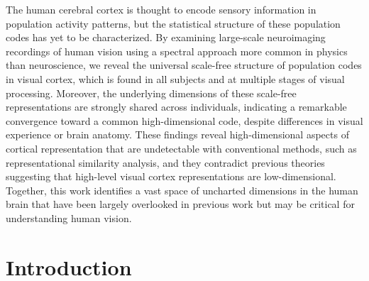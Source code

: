 \documentclass[10pt]{article}
\begin{document}
The human cerebral cortex is thought to encode sensory information in population activity patterns, but the statistical structure of these population codes has yet to be characterized. By examining large-scale neuroimaging recordings of human vision using a spectral approach more common in physics than neuroscience, we reveal the universal scale-free structure of population codes in visual cortex, which is found in all subjects and at multiple stages of visual processing. Moreover, the underlying dimensions of these scale-free representations are strongly shared across individuals, indicating a remarkable convergence toward a common high-dimensional code, despite differences in visual experience or brain anatomy. These findings reveal high-dimensional aspects of cortical representation that are undetectable with conventional methods, such as representational similarity analysis, and they contradict previous theories suggesting that high-level visual cortex representations are low-dimensional. Together, this work identifies a vast space of uncharted dimensions in the human brain that have been largely overlooked in previous work but may be critical for understanding human vision.

\section{Introduction}\label{introduction}
\end{document}
